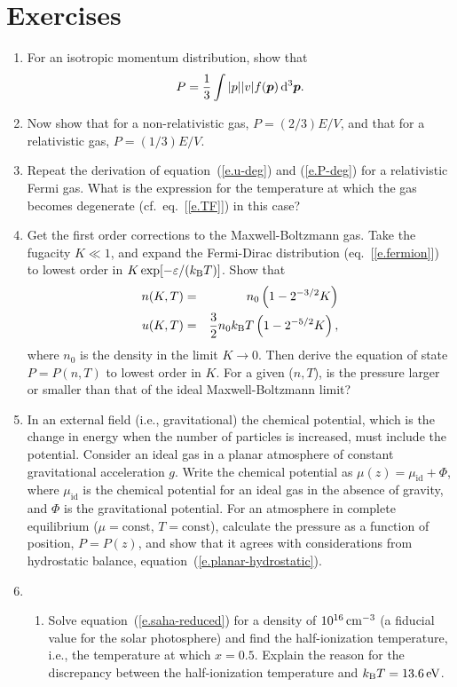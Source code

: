 \section{Exercises}\label{s.EOS-exercises}
\begin{enumerate}
\item For an isotropic momentum distribution, show that 
\[
P = \frac{1}{3}\int |p||v| f(\boldsymbol{p})\,\mathrm{d}^{3}\boldsymbol{p}.
\]
\item Now show that for a non-relativistic gas, $P = (2/3)E/V$, and that for a relativistic gas, $P = (1/3)E/V$.

\item Repeat the derivation of equation~(\ref{e.u-deg}) and (\ref{e.P-deg}) for  a relativistic Fermi gas. What is the expression for the temperature at which the gas becomes degenerate (cf.~eq.~[\ref{e.TF}]) in this case?

\item Get the first order corrections to the Maxwell-Boltzmann gas. Take the fugacity $K \ll 1$, and expand the Fermi-Dirac distribution  (eq.~[\ref{e.fermion}]) to lowest order in $K\exp[-\varepsilon/(k_\mathrm{B} T)]$. Show that 
\begin{eqnarray*}
 n(K,T) &=& n_{0}\left(1 - 2^{-3/2}K\right) \\
 u(K,T) &=& \frac{3}{2}n_{0}k_\mathrm{B} T \left(1-2^{-5/2}K\right),
\end{eqnarray*}
where $n_{0}$ is the density in the limit $K\to 0$.
Then derive the equation of state $P = P(n,T)$ to lowest order in $K$. For a given ($n, T$), is the pressure larger or smaller than that of the ideal Maxwell-Boltzmann limit?

\item In an external field (i.e., gravitational) the chemical potential, which is the change in energy when the number of particles is increased, must include the potential.  Consider an ideal gas in a planar atmosphere of  constant gravitational acceleration $g$.  Write the chemical potential as $\mu(z)  = \mu_{\mathrm{id}} + \Phi$, where $\mu_{\mathrm{id}}$ is the chemical potential for an ideal gas in the absence of gravity, and $\Phi$ is the gravitational potential.  For an atmosphere in complete equilibrium ($\mu = \mathrm{const}$, $T = \mathrm{const}$), calculate the pressure as a function of position, $P = P(z)$, and show that it agrees with considerations from hydrostatic balance, equation~(\ref{e.planar-hydrostatic}).

\item 
\begin{enumerate}
\item Solve equation~(\ref{e.saha-reduced}) for a density of $10^{16}\,\mathrm{c}\mathrm{m}^{-3}$ (a fiducial value for the solar photosphere) and find the half-ionization temperature, i.e., the temperature at which $x=0.5$.  Explain the reason for the discrepancy between the half-ionization temperature and $k_\mathrm{B} T = 13.6\,\mathrm{eV}$.


\end{enumerate}
\end{enumerate}
